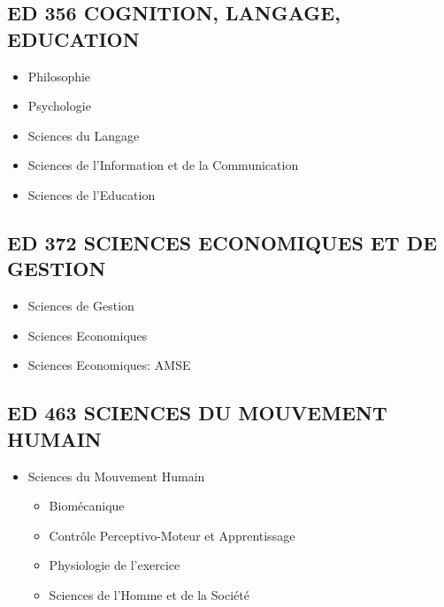 	\subsection*{ED 356 COGNITION, LANGAGE, EDUCATION}\label{ed-356-cognition-langage-education}

		\begin{itemize}
		\item Philosophie
		\item Psychologie
		\item Sciences du Langage
		\item Sciences de l'Information et de la Communication
		\item Sciences de l'Education
		\end{itemize}

	\subsection*{ED 372 SCIENCES ECONOMIQUES ET DE GESTION}\label{ed-372-sciences-economiques-et-de-gestion}

		\begin{itemize}
		\item Sciences de Gestion
		\item Sciences Economiques
		\item Sciences Economiques: AMSE
		\end{itemize}

	\subsection*{ED 463 SCIENCES DU MOUVEMENT HUMAIN}\label{ed-463-sciences-du-mouvement-humain}

		\begin{itemize}
		\item Sciences du Mouvement Humain
		\begin{itemize}
		\item Biomécanique
		\item Contrôle Perceptivo-Moteur et Apprentissage
		\item Physiologie de l'exercice
		\item Sciences de l'Homme et de la Société
		\end{itemize}
		\end{itemize}

